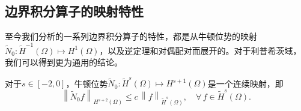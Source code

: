 \subsection{边界积分算子的映射特性}
\label{sec:bvp-bie-mapping-properties}
至今我们分析的一系列边界积分算子的特性，都是从牛顿位势的映射$\widetilde{N}_{0}:\widetilde{H}^{-1}(\Omega) \mapsto H^{1}(\Omega)$，以及逆定理和对偶配对而展开的。对于利普希茨域，我们可以得到更为通用的结论。

\begin{theorem}[牛顿位势在利普希茨域中的映射特性]
  \label{theorem:bie-newton-mapping}
  对于$s \in [-2,0]$，牛顿位势$\widetilde{N}_{0}:\widetilde{H}^{s}(\Omega) \mapsto H^{s+1}(\Omega)$是一个连续映射，即
  \begin{equation*}
    \left\|
    \widetilde{N}_{0} f
    \right\|_{H^{s+2}(\Omega)}
    \le c \, \left\| f \right\|_{\widetilde{H}^{s}(\Omega)}, \quad \forall \, f \in \widetilde{H}^{s}(\Omega).
  \end{equation*}
\end{theorem}
